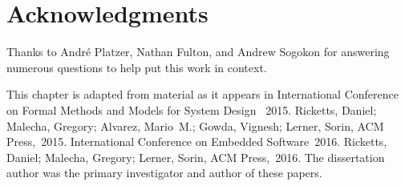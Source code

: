 \section{Acknowledgments}
Thanks to Andr\'e Platzer, Nathan Fulton, and Andrew Sogokon for answering
numerous questions to help put this work in context.

This chapter is adapted from material as it appears in International
Conference on Formal Methods and Models for System Design ~2015.  Ricketts,
Daniel; Malecha, Gregory; Alvarez, Mario~M.; Gowda, Vignesh; Lerner, Sorin,
ACM Press,~2015. International Conference on Embedded Software~2016.
Ricketts, Daniel; Malecha, Gregory; Lerner, Sorin, ACM Press,~2016. The
dissertation author was the primary investigator and author of these
papers.
